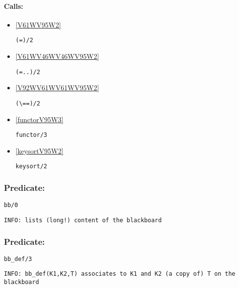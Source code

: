 \paragraph{Calls:} 
\begin{itemize}
\item \ref{V61WV95W2} 
\begin{verbatim}
(=)/2
\end{verbatim}

\item \ref{V61WV46WV46WV95W2} 
\begin{verbatim}
(=..)/2
\end{verbatim}

\item \ref{V92WV61WV61WV95W2} 
\begin{verbatim}
(\==)/2
\end{verbatim}

\item \ref{functorV95W3} 
\begin{verbatim}
functor/3
\end{verbatim}

\item \ref{keysortV95W2} 
\begin{verbatim}
keysort/2
\end{verbatim}

\end{itemize}

\subsubsection{Predicate:} \label{bbV95W0}

\begin{verbatim}
bb/0
\end{verbatim}

{\small \begin{verbatim}
INFO: lists (long!) content of the blackboard

\end{verbatim}}

\subsubsection{Predicate:} \label{bbV95WdefV95W3}

\begin{verbatim}
bb_def/3
\end{verbatim}

{\small \begin{verbatim}
INFO: bb_def(K1,K2,T) associates to K1 and K2 (a copy of) T on the blackboard

\end{verbatim}}

